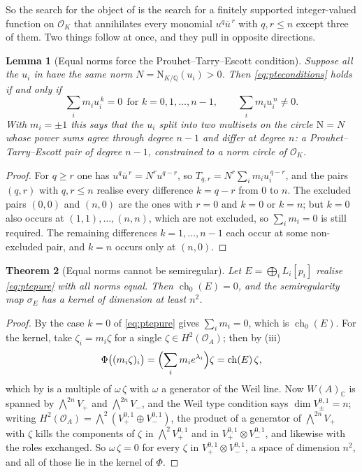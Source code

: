 \documentclass[11pt,reqno]{amsart}
\theoremstyle{plain}
\newtheorem{theorem}{Theorem}[section]
\newtheorem{lemma}[theorem]{Lemma}
\theoremstyle{definition}
\theoremstyle{remark}
\newcommand{\QQ}{\mathbb{Q}}
\newcommand{\CC}{\mathbb{C}}
\newcommand{\cO}{\mathcal{O}}
\newcommand{\HW}{W}                      %
\newcommand{\Nm}{\mathrm{N}}             %
\DeclareMathOperator{\ch}{ch}
\newcommand{\bbar}[1]{\overline{#1}}
\begin{document}
So the search for the object of  is the search for a
finitely supported integer-valued function on $\cO_{K}$ that annihilates every
monomial $u^{q}\bbar u^{\,r}$ with $q,r\le n$ except three of them. Two things
follow at once, and they pull in opposite directions.

\begin{lemma}[Equal norms force the Prouhet--Tarry--Escott condition]
\label{lem:pte}
Suppose all the $u_{i}$ in  have the same norm
$N=\Nm_{K/\QQ}(u_{i})>0$. Then \eqref{eq:pteconditions} holds if and only if
\begin{equation}\label{eq:ptepure}
  \sum_{i}m_{i}u_{i}^{\,k}=0\ \ \text{for } k=0,1,\dots,n-1,
  \qquad
  \sum_{i}m_{i}u_{i}^{\,n}\ne0 .
\end{equation}
With $m_{i}=\pm1$ this says that the $u_{i}$ split into two multisets on the
circle $\Nm=N$ whose power sums agree through degree $n-1$ and differ at
degree $n$: a Prouhet--Tarry--Escott pair of degree $n-1$, constrained to a
norm circle of $\cO_{K}$.
\end{lemma}

\begin{proof}
For $q\ge r$ one has $u^{q}\bbar u^{\,r}=N^{r}u^{q-r}$, so
$T_{q,r}=N^{r}\sum_{i}m_{i}u_{i}^{\,q-r}$, and the pairs $(q,r)$ with
$q,r\le n$ realise every difference $k=q-r$ from $0$ to $n$. The excluded
pairs $(0,0)$ and $(n,0)$ are the ones with $r=0$ and $k=0$ or $k=n$; but
$k=0$ also occurs at $(1,1),\dots,(n,n)$, which are not excluded, so
$\sum_{i}m_{i}=0$ is still required. The remaining differences
$k=1,\dots,n-1$ each occur at some non-excluded pair, and $k=n$ occurs only at
$(n,0)$.
\end{proof}

\begin{theorem}[Equal norms cannot be semiregular]\label{thm:equalnorms}
Let $E=\bigoplus_{i}L_{i}[p_{i}]$ realise \eqref{eq:ptepure} with all norms
equal. Then $\ch_{0}(E)=0$, and the semiregularity map $\sigma_{E}$ has a
kernel of dimension at least $n^{2}$.
\end{theorem}

\begin{proof}
By  the case $k=0$ of \eqref{eq:ptepure} gives
$\sum_{i}m_{i}=0$, which is $\ch_{0}(E)$. For the kernel, take
$\zeta_{i}=m_{i}\zeta$ for a single $\zeta\in H^{2}(\cO_{A})$; then by
(iii)
\[
  \Phi\bigl((m_{i}\zeta)_{i}\bigr)
  =\Bigl(\sum_{i}m_{i}e^{\lambda_{i}}\Bigr)\zeta=\ch(E)\,\zeta ,
\]
which by  is a multiple of $\omega\,\zeta$ with
$\omega$ a generator of the Weil line. Now $\HW(A)_{\CC}$ is spanned by
$\bigwedge^{2n}V_{+}$ and $\bigwedge^{2n}V_{-}$, and the Weil type condition
says $\dim V_{\pm}^{0,1}=n$; writing
$H^{2}(\cO_{A})=\bigwedge^{2}(V_{+}^{0,1}\oplus V_{-}^{0,1})$, the product of
a generator of $\bigwedge^{2n}V_{+}$ with $\zeta$ kills the components of
$\zeta$ in $\bigwedge^{2}V_{+}^{0,1}$ and in
$V_{+}^{0,1}\otimes V_{-}^{0,1}$, and likewise with the roles exchanged. So
$\omega\,\zeta=0$ for every $\zeta$ in
$V_{+}^{0,1}\otimes V_{-}^{0,1}$, a space of dimension $n^{2}$, and all of
those lie in the kernel of $\Phi$.
\end{proof}
\end{document}
